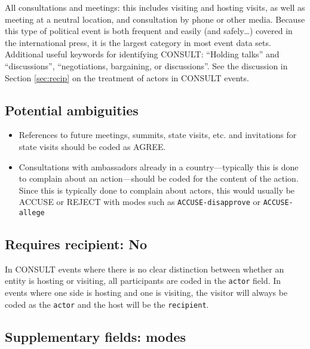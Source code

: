 \documentclass[11pt]{report}
\newcommand{\plcat}[1]{\textsf{#1}}
\newcommand{\txt}[1]{\texttt{#1}}
\begin{document}
All consultations and meetings: this includes visiting and hosting visits, as well as meeting at a neutral location, and consultation by phone or other media. Because this type of political event is both frequent and easily (and safely\ldots) covered in the international press, it is the largest category in most event data sets.  Additional useful keywords for identifying \plcat{CONSULT}: ``Holding talks'' and ``discussions'', ``negotiations, bargaining, or discussions''. See the discussion in Section \ref{sec:recip} on the treatment of actors in \plcat{CONSULT} events.

\subsection{Potential ambiguities}

\begin{itemize}

\item References to future meetings, summits, state visits, etc. and invitations for state visits should be coded as \plcat{AGREE}.

\item Consultations with ambassadors already in a country---typically this is done to complain about an action---should be coded for the content of the action. Since this is typically done to complain about actors, this would usually be \plcat{ACCUSE} or \plcat{REJECT} with modes such as \txt{ACCUSE-disapprove} or \txt{ACCUSE-allege}

\end{itemize}

\subsection{Requires recipient: No}

In \plcat{CONSULT} events where there is no clear distinction between whether an entity is hosting or visiting, all participants are coded in the \txt{actor} field. In events where one side is hosting and one is visiting, the visitor will always be coded as the \txt{actor} and the host will be the \txt{recipient}.

\subsection{Supplementary fields: modes}
\end{document}
